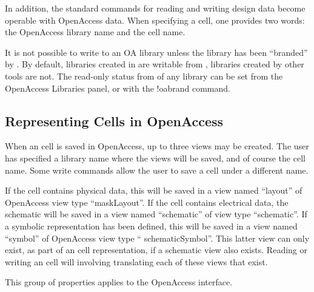 In addition, the standard commands for reading and writing design data
become operable with OpenAccess data.  When specifying a cell, one
provides two words:  the OpenAccess library name and the cell name.

It is not possible to write to an OA library unless the library has
been ``branded'' by {\Xic}.  By default, libraries created in {\Xic}
are writable from {\Xic}, libraries created by other tools are not. 
The read-only status from {\Xic} of any library can be set from the
{\cb OpenAccess Libraries} panel, or with the {\cb !oabrand} command.

\subsection{Representing {\Xic} Cells in OpenAccess}

When an {\Xic} cell is saved in OpenAccess, up to three views may be
created.  The user has specified a library name where the views will
be saved, and of course the cell name.  Some write commands allow the
user to save a cell under a different name.

If the cell contains physical data, this will be saved in a view named
``{\vt layout}'' of OpenAccess view type ``{\vt maskLayout}''.  If the
cell contains electrical data, the schematic will be saved in a view
named ``{\vt schematic}'' of view type ``{\vt schematic}''.  If a
symbolic representation has been defined, this will be saved in a view
named ``{\vt symbol}'' of OpenAccess view type ``{\vt
schematicSymbol}''.  This latter view can only exist, as part of an
{\Xic} cell representation, if a schematic view also exists.  Reading
or writing an {\Xic} cell will involving translating each of these
views that exist.

This group of properties applies to the OpenAccess interface.


